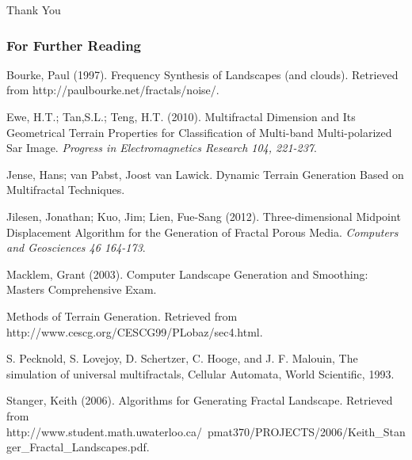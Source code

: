 \documentclass{beamer}
\begin{document}
\begin{frame}
 Thank You
\end{frame}



\begin{frame}[shrink=30]
  \frametitle{For Further Reading}
  
Bourke, Paul (1997). Frequency Synthesis of Landscapes (and clouds). Retrieved from http://paulbourke.net/fractals/noise/.
 
 Ewe, H.T.; Tan,S.L.; Teng, H.T. (2010). Multifractal Dimension and Its Geometrical Terrain Properties for Classification of Multi-band Multi-polarized Sar Image. \emph{Progress in Electromagnetics Research 104, 221-237}.
 
 Jense, Hans; van Pabst, Joost van Lawick. Dynamic Terrain Generation Based on Multifractal Techniques. 
 
 Jilesen, Jonathan; Kuo, Jim; Lien, Fue-Sang (2012). Three-dimensional Midpoint Displacement Algorithm for the Generation of Fractal Porous Media. \emph{Computers and Geosciences 46 164-173}.
 
 Macklem, Grant (2003). Computer Landscape Generation and Smoothing: Masters Comprehensive Exam.
   
Methods of Terrain Generation. Retrieved from http://www.cescg.org/CESCG99/PLobaz/sec4.html.

S. Pecknold, S. Lovejoy, D. Schertzer, C. Hooge, and J. F. Malouin, The simulation of universal multifractals, Cellular Automata, World Scientific, 1993.

Stanger, Keith (2006). Algorithms for Generating Fractal Landscape. Retrieved from http://www.student.math.uwaterloo.ca/~pmat370/PROJECTS/2006/Keith_Stanger_Fractal_Landscapes.pdf.


   
    
    

 

\end{frame}
\end{document}
